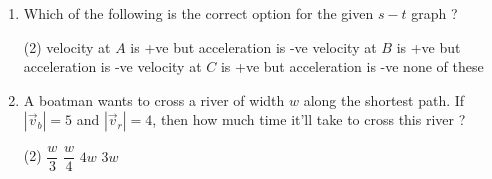 \documentclass{article}
\renewcommand{\ans}{\quad}
\begin{document}
\begin{enumerate}
        \begin{tasks}(2)
            \task \OptionA\ans
            \task \OptionB
            \task \OptionC
            \task \OptionD
        \end{tasks}
        

        \item Which of the following is the correct option for the given $s-t$ graph ?
        \begin{center}
        \end{center}
        \begin{tasks}(2)
            \task velocity at $A$ is +ve but acceleration is -ve
            \task velocity at $B$ is +ve but acceleration is -ve\ans
            \task velocity at $C$ is +ve but acceleration is -ve
            \task none of these
        \end{tasks}

        \item A boatman wants to cross a river of width $w$ along the shortest path. If $|\Vec{v}_b|=5$ and $|\Vec{v}_r|=4$, then how much time it'll take to cross this river ?
        \begin{center}
        \end{center}
        \begin{tasks}(2)
            \task $\dfrac{w}{3}$\ans
            \task $\dfrac{w}{4}$
            \task $4w$
            \task $3w$
        \end{tasks}


\end{enumerate}
\end{document}
